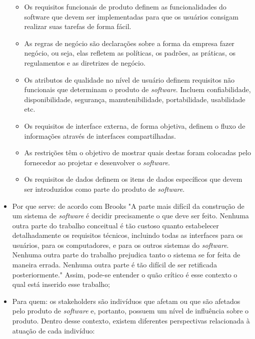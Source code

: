 \begin{itemize}
\begin{itemize}
    \item Os requisitos funcionais de produto definem as funcionalidades do software que devem ser implementadas para que os usuários consigam realizar suas tarefas de forma fácil.
    
    \item As regras de negócio são declarações sobre a forma da empresa fazer negócio, ou seja, elas refletem as políticas, os padrões, as práticas, os regulamentos e as diretrizes de negócio.
    
    \item Os atributos de qualidade no nível de usuário definem requisitos não funcionais que determinam o produto de \textit{software}. Incluem confiabilidade, disponibilidade, segurança, manutenibilidade, portabilidade, usabilidade etc.
    
    \item Os requisitos de interface externa, de forma objetiva, definem o fluxo de informações através de interfaces compartilhadas.
    
    \item As restrições têm o objetivo de mostrar quais destas foram colocadas pelo fornecedor ao projetar e desenvolver o \textit{software}.
    
    \item Os requisitos de dados definem os itens de dados específicos que devem ser introduzidos como parte do produto de \textit{software}.
    
    \end{itemize}
    
    \item Por que serve: de acordo com Brooks \cite[p.~199]{brooks1995mythical} "A parte mais difícil da construção de um sistema de \textit{software} é decidir precisamente o que deve ser feito. Nenhuma outra parte do trabalho conceitual é tão  custoso quanto estabelecer detalhadamente os requisitos técnicos, incluindo todas as interfaces para os usuários, para os computadores, e para os outros sistemas do \textit{software}. Nenhuma outra parte do trabalho prejudica tanto o sistema se for feita de maneira errada. Nenhuma outra parte é tão difícil de ser retificada posteriormente." Assim, pode-se entender o quão crítico é esse contexto o qual está inserido esse trabalho;
    
    \item Para quem: os stakeholders são indivíduos que afetam ou que são afetados pelo produto de \textit{software} e, portanto, possuem um nível de influência sobre o produto. Dentro desse contexto, existem diferentes perspectivas relacionada à atuação de cada indivíduo:
    

\end{itemize}
